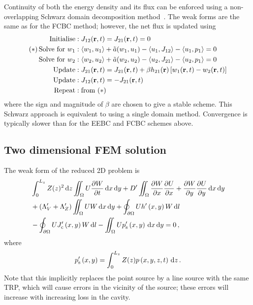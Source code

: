 \documentclass[a4paper]{article}
\numberwithin{equation}{section}
\begin{document}
Continuity of both the energy density and its flux can be enforced using a non-overlapping Schwarz domain decomposition
method~\citep{Lions1990}. The weak forms are the same as for the FCBC method; however, the net flux is updated using
\begin{align}
\mathrm{Initialise} &: J_{12}(\boldsymbol{\mathrm{r}},t) = J_{21}(\boldsymbol{\mathrm{r}},t) = 0 \nonumber \\
\mathrm{(\ast)\,Solve\,\,for}\,\,w_1 &: \langle w_1,u_1 \rangle + \tilde{a}(w_1,u_1) - \langle u_1 , J_{12} \rangle - \langle u_1 , p_1 \rangle = 0 \nonumber \\
\mathrm{Solve\,\,for}\,\,w_2 &: \langle w_2,u_2 \rangle + \tilde{a}(w_2,u_2) - \langle u_2 , J_{21} \rangle - \langle u_2 , p_1 \rangle = 0 \nonumber \\
\mathrm{Update} &: J_{21}(\boldsymbol{\mathrm{r}},t) = J_{21}(\boldsymbol{\mathrm{r}},t) + \beta h_{21}(\boldsymbol{\mathrm{r}}) \left[ w_1(\boldsymbol{\mathrm{r}},t) - w_2(\boldsymbol{\mathrm{r}},t) \right] \nonumber \\
\mathrm{Update} &: J_{12}(\boldsymbol{\mathrm{r}},t) = -J_{21}(\boldsymbol{\mathrm{r}},t) \nonumber \\
\mathrm{Repeat} &: \mathrm{from}\,\,(\ast) \nonumber
\end{align}
where the sign and magnitude of $\beta$ are chosen to give a stable scheme. This Schwarz approach
is equivalent to using a single domain method. Convergence is typically slower than for the 
EEBC and FCBC schemes above.

\subsection[Two dimensional FEM solution]{Two dimensional FEM solution}
\label{sc:fem:2d}

The weak form of the reduced 2D problem is
\begin{align}
&\int_0^{L_z}Z(z)^2\,\mathrm{d}{z}\iint_{\Omega} U\frac{{\partial}W}{{\partial}t}\,\mathrm{d}{x}\,\mathrm{d}{y}
+D^\prime\iint_{\Omega}\frac{{\partial}W}{{\partial}x}\frac{{\partial}U}{{\partial}x}+\frac{{\partial}W}{{\partial}y}\frac{{\partial}U}{{\partial}y}\,\mathrm{d}{x}\,\mathrm{d}{y} \nonumber \\
&+\left(\Lambda_V^\prime+\Lambda_Z^\prime\right)\iint_{\Omega }UW\,\mathrm{d}{x}\,\mathrm{d}{y}
+\oint_{\partial\Omega} Uh^\prime\left(x,y\right)W\,\mathrm{d}{l} \nonumber \\
&-\oint_{\partial\Omega} UJ_{\mathrm{c}}^\prime\left(x,y\right) W\,\mathrm{d}{l}
-\iint_{\Omega} U p_{\mathrm{s}}^\prime\left(x,y\right)\,\mathrm{d}{x}\,\mathrm{d}{y}=0\,,
\end{align}
where
\begin{align}
p_{\mathrm{s}}^\prime\left(x,y\right)=\int_0^{L_z}Z(z)p\left(x,y,z,t\right)\,\mathrm{d}{z}\,.
\end{align}
Note that this implicitly replaces the point source by a line source with the same TRP, which 
will cause errors in the vicinity of the source; these errors will increase with increasing
loss in the cavity.
\end{document}
